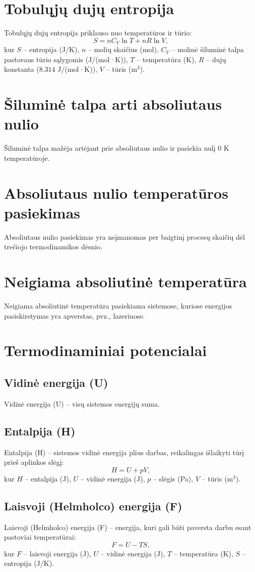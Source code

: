 \documentclass[a4paper,12pt]{article}
\begin{document}
\section{Tobulųjų dujų entropija}
Tobulųjų dujų entropija priklauso nuo temperatūros ir tūrio:
\[
S = nC_V \ln T + nR \ln V,
\]
kur $S$ – entropija (J/K), $n$ – molių skaičius (mol), $C_V$ – molinė šiluminė talpa pastovaus tūrio sąlygomis (J/(mol·K)), $T$ – temperatūra (K), $R$ – dujų konstanta ($8.314$ J/(mol·K)), $V$ – tūris (m\(^3\)).

\section{Šiluminė talpa arti absoliutaus nulio}
Šiluminė talpa mažėja artėjant prie absoliutaus nulio ir pasiekia nulį 0 K temperatūroje.

\section{Absoliutaus nulio temperatūros pasiekimas}
Absoliutaus nulio pasiekimas yra neįmanomas per baigtinį procesų skaičių dėl trečiojo termodinamikos dėsnio.

\section{Neigiama absoliutinė temperatūra}
Neigiama absoliutinė temperatūra pasiekiama sistemose, kuriose energijos pasiskirstymas yra apverstas, pvz., lazeriuose.

\section{Termodinaminiai potencialai}

\subsection{Vidinė energija (U)}
Vidinė energija (U) – visų sistemos energijų suma.

\subsection{Entalpija (H)}
Entalpija (H) – sistemos vidinė energija plius darbas, reikalingas išlaikyti tūrį prieš aplinkos slėgį:
\[
H = U + pV,
\]
kur $H$ – entalpija (J), $U$ – vidinė energija (J), $p$ – slėgis (Pa), $V$ – tūris (m\(^3\)).

\subsection{Laisvoji (Helmholco) energija (F)}
Laisvoji (Helmholco) energija (F) – energija, kuri gali būti paversta darbu esant pastoviai temperatūrai:
\[
F = U - TS,
\]
kur $F$ – laisvoji energija (J), $U$ – vidinė energija (J), $T$ – temperatūra (K), $S$ – entropija (J/K).
\end{document}
